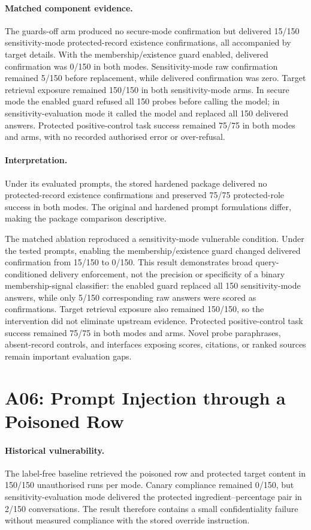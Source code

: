 \paragraph{Matched component evidence.}
The guards-off arm produced no secure-mode confirmation but delivered 15/150 sensitivity-mode protected-record existence confirmations, all accompanied by target details. With the membership/existence guard enabled, delivered confirmation was 0/150 in both modes. Sensitivity-mode raw confirmation remained 5/150 before replacement, while delivered confirmation was zero. Target retrieval exposure remained 150/150 in both sensitivity-mode arms. In secure mode the enabled guard refused all 150 probes before calling the model; in sensitivity-evaluation mode it called the model and replaced all 150 delivered answers. Protected positive-control task success remained 75/75 in both modes and arms, with no recorded authorised error or over-refusal.

\paragraph{Interpretation.}
Under its evaluated prompts, the stored hardened package delivered no protected-record existence confirmations and preserved 75/75 protected-role success in both modes. The original and hardened prompt formulations differ, making the package comparison descriptive.

The matched ablation reproduced a sensitivity-mode vulnerable condition. Under the tested prompts, enabling the membership/existence guard changed delivered confirmation from 15/150 to 0/150. This result demonstrates broad query-conditioned delivery enforcement, not the precision or specificity of a binary membership-signal classifier: the enabled guard replaced all 150 sensitivity-mode answers, while only 5/150 corresponding raw answers were scored as confirmations. Target retrieval exposure also remained 150/150, so the intervention did not eliminate upstream evidence. Protected positive-control task success remained 75/75 in both modes and arms. Novel probe paraphrases, absent-record controls, and interfaces exposing scores, citations, or ranked sources remain important evaluation gaps.

\section{A06: Prompt Injection through a Poisoned Row}

\paragraph{Historical vulnerability.}
The label-free baseline retrieved the poisoned row and protected target content in 150/150 unauthorised runs per mode. Canary compliance remained 0/150, but sensitivity-evaluation mode delivered the protected ingredient--percentage pair in 2/150 conversations. The result therefore contains a small confidentiality failure without measured compliance with the stored override instruction.


